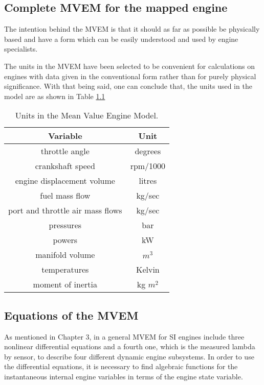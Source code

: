 \begin{appendices}

\chapter{Complete MVEM for the mapped engine}
The intention behind the MVEM is that it should as far as possible be physically based and have a form which can be easily understood and used by engine specialists.

The units in the MVEM have been selected to be convenient for calculations on engines with data given in the conventional form rather than for purely physical significance. With that being said, one can conclude that, the units used in the model are as shown in Table \ref{table:units}

\begin{table}[htb]
	\centering
	\vspace*{-1ex}
	\scriptsize
	\vspace{-1ex}
	\caption{Units in the Mean Value Engine Model.}
	\begin{tabular}{|c|c|}
        \hline
        \textbf{Variable}      & \textbf{Unit}\\ \hline 
        throttle angle         & degrees \\
        crankshaft speed        & rpm/1000 \\
        engine displacement volume     & litres \\
        fuel mass flow            & kg/sec \\
        port and throttle air mass flows         & kg/sec \\
        pressures               & bar \\
        powers               & kW \\
        manifold volume               & $m^3$ \\
        temperatures               & Kelvin \\
        moment of inertia               & kg $m^2$ \\
        \hline
    \end{tabular}
    \label{table:units}
\end{table}

\section{Equations of the MVEM}

As mentioned in Chapter 3, in a general MVEM for SI engines include three nonlinear differential equations  and a fourth one, which is the measured lambda by sensor, to describe four different dynamic engine subsystems. In order to use the differential equations, it is necessary to find algebraic functions for the instantaneous internal engine variables in terms of the engine state variable.


\end{appendices}
